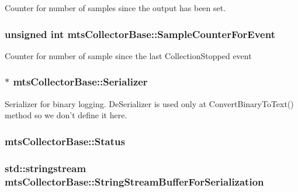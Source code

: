 Counter for number of samples since the output has been set. \hypertarget{classmts_collector_base_a199b6fdd92f3a5912b6d7fd10af5b205}{
\subsubsection[{Sample\-Counter\-For\-Event}]{\setlength{\rightskip}{0pt plus 5cm}unsigned int mts\-Collector\-Base\-::\-Sample\-Counter\-For\-Event\hspace{0.3cm}{\ttfamily [protected]}}}\label{classmts_collector_base_a199b6fdd92f3a5912b6d7fd10af5b205}
Counter for number of sample since the last Collection\-Stopped event \hypertarget{classmts_collector_base_abf646aaaee11b73bf1fff9f31131fac1}{
\subsubsection[{Serializer}]{$\ast$ mts\-Collector\-Base\-::\-Serializer\hspace{0.3cm}{\ttfamily [protected]}}}\label{classmts_collector_base_abf646aaaee11b73bf1fff9f31131fac1}
Serializer for binary logging. De\-Serializer is used only at Convert\-Binary\-To\-Text() method so we don't define it here. \hypertarget{classmts_collector_base_ae5b1e57c993774b77da77f1e1fc7d73c}{
\subsubsection[{Status}]{ mts\-Collector\-Base\-::\-Status\hspace{0.3cm}{\ttfamily [protected]}}}\label{classmts_collector_base_ae5b1e57c993774b77da77f1e1fc7d73c}
\hypertarget{classmts_collector_base_a782f339bd561cc62d195544fdb873834}{
\subsubsection[{String\-Stream\-Buffer\-For\-Serialization}]{\setlength{\rightskip}{0pt plus 5cm}std\-::stringstream mts\-Collector\-Base\-::\-String\-Stream\-Buffer\-For\-Serialization\hspace{0.3cm}{\ttfamily [protected]}}}\label{classmts_collector_base_a782f339bd561cc62d195544fdb873834}
